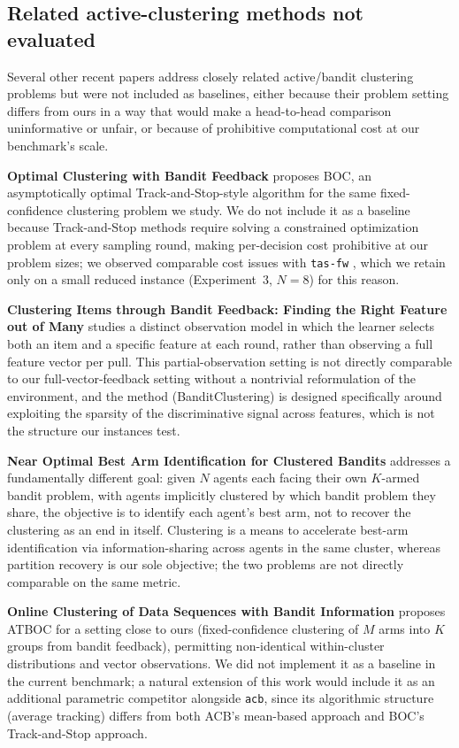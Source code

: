 \documentclass[11pt]{article}
\begin{document}
\subsection{Related active-clustering methods not evaluated}
\label{sec:related-not-evaluated}

Several other recent papers address closely related active/bandit
clustering problems but were not included as baselines, either because
their problem setting differs from ours in a way that would make a
head-to-head comparison uninformative or unfair, or because of
prohibitive computational cost at our benchmark's scale.

\textbf{Optimal Clustering with Bandit Feedback} \cite{boc2024} proposes
BOC, an asymptotically optimal Track-and-Stop-style algorithm for the same
fixed-confidence clustering problem we study. We do not include it as a
baseline because Track-and-Stop methods require solving a constrained
optimization problem at every sampling round, making per-decision cost
prohibitive at our problem sizes; we observed comparable cost issues with
\texttt{tas-fw} \cite{tasfw2024}, which we retain only on a small reduced
instance (Experiment~3, $N=8$) for this reason.

\textbf{Clustering Items through Bandit Feedback: Finding the Right
Feature out of Many} \cite{banditclustering2025} studies a distinct
observation model in which the learner selects both an item and a
specific feature at each round, rather than observing a full feature
vector per pull. This partial-observation setting is not directly
comparable to our full-vector-feedback setting without a nontrivial
reformulation of the environment, and the method (BanditClustering) is
designed specifically around exploiting the sparsity of the discriminative
signal across features, which is not the structure our instances test.

\textbf{Near Optimal Best Arm Identification for Clustered Bandits}
\cite{clusteredbai2025} addresses a fundamentally different goal: given
$N$ agents each facing their own $K$-armed bandit problem, with agents
implicitly clustered by which bandit problem they share, the objective is
to identify each agent's best arm, not to recover the clustering as an end
in itself. Clustering is a means to accelerate best-arm identification via
information-sharing across agents in the same cluster, whereas partition
recovery is our sole objective; the two problems are not directly
comparable on the same metric.

\textbf{Online Clustering of Data Sequences with Bandit Information}
\cite{atboc2025} proposes ATBOC for a setting close to ours
(fixed-confidence clustering of $M$ arms into $K$ groups from bandit
feedback), permitting non-identical within-cluster distributions and
vector observations. We did not implement it as a baseline in the current
benchmark; a natural extension of this work would include it as an
additional parametric competitor alongside \texttt{acb}, since its
algorithmic structure (average tracking) differs from both ACB's
mean-based approach and BOC's Track-and-Stop approach.
\end{document}
